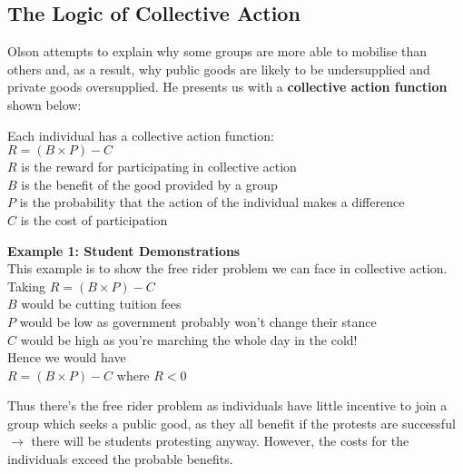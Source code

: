 \documentclass[12pt, letterpaper]{article}
\begin{document}
\subsection{The Logic of Collective Action}
Olson attempts to explain why some groups are more able to mobilise than others and, as a result, why public goods are likely to be undersupplied and private goods oversupplied. He presents us with a \textbf{collective action function} shown below:

\begin{center}
Each individual has a collective action function: \\
$R=(B \times P) - C$ \\
$R$ is the reward for participating in collective action \\
$B$ is the benefit of the good provided by a group \\
$P$ is the probability that the action of the individual makes a difference \\
$C$ is the cost of participation
\end{center}

\begin{center}
\textbf{Example 1: Student Demonstrations} \\
This example is to show the free rider problem we can face in collective action. \\
Taking $R=(B \times P) - C$ \\
$B$ would be cutting tuition fees \\
$P$ would be low as government probably won't change their stance \\
$C$ would be high as you're marching the whole day in the cold! \\
Hence we would have \\
$R=(B \times P) - C$ where $R<0$
\end{center}

Thus there's the free rider problem as individuals have little incentive to join a group which seeks a public good, as they all benefit if the protests are successful $\rightarrow$ there will be students protesting anyway. However, the costs for the individuals exceed the probable benefits.
\end{document}
